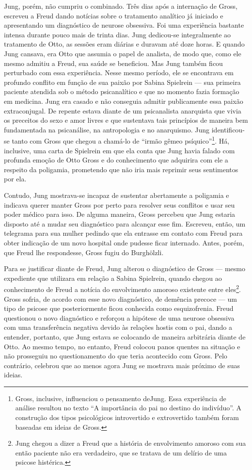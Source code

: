 Jung, porém, não cumpriu o combinado. Três dias após a internação de
Gross, escreveu a Freud dando notícias sobre o tratamento analítico já
iniciado e apresentando um diagnóstico de neurose obsessiva. Foi uma
experiência bastante intensa durante pouco mais de trinta dias. Jung
dedicou-se integralmente ao tratamento de Otto, as sessões eram diárias
e duravam até doze horas. E quando Jung cansava, era Otto que assumia o
papel de analista, de modo que, como ele mesmo admitiu a Freud, sua
saúde se beneficiou. Mas Jung também ficou perturbado com essa
experiência. Nesse mesmo período, ele se encontrava em profundo conflito
em função de sua paixão por Sabina Spielrein --- sua primeira paciente
atendida sob o método psicanalítico e que no momento fazia formação em
medicina. Jung era casado e não conseguia admitir publicamente essa
paixão extraconjugal. De repente estava diante de um psicanalista
anarquista que vivia os preceitos do sexo e amor livres e que sustentava
tais princípios de maneira bem fundamentada na psicanálise, na
antropologia e no anarquismo. Jung identificou-se tanto com Gross que
chegou a chamá-lo de ``irmão gêmeo psíquico''\footnote{Gross, inclusive,
  influenciou o pensamento deJung. Essa experiência de análise resultou
  no texto ``A importância do pai no destino do indivíduo''. A
  construção dos tipos psicológicos introvertido e extrovertido também
  foram baseadas em ideias de Gross.}. Há, inclusive, uma carta de
Spielrein em que ela conta que Jung havia falado com profunda emoção de
Otto Gross e do conhecimento que adquirira com ele a respeito da
poligamia, prometendo que não iria mais reprimir seus sentimentos por
ela.

Contudo, Jung mostrava-se incapaz de sustentar abertamente a poligamia e
indicava querer manter Gross por perto para resolver seus conflitos e
usar seu poder médico para isso. De alguma maneira, Gross percebeu que
Jung estaria disposto até a mudar seu diagnóstico para alcançar esse
fim. Escreveu, então, um telegrama para sua mulher pedindo que ela
entrasse em contato com Freud para obter indicação de um novo hospital
onde pudesse ficar internado. Antes, porém, que Freud lhe respondesse,
Gross fugiu do Burghölzli.

Para se justificar diante de Freud, Jung alterou o diagnóstico de Gross
--- mesmo expediente que utilizara em relação a Sabina Spielrein, quando
chegou ao conhecimento de Freud a notícia do envolvimento amoroso
existente entre eles\footnote{Jung chegou a dizer a Freud que a história
  de envolvimento amoroso com sua então paciente não era verdadeiro, que
  se tratava de um delírio de uma psicose histérica.}. Gross sofria, de
acordo com esse novo diagnóstico, de demência precoce --- um tipo de
psicose que posteriormente ficou conhecida como esquizofrenia. Freud
questionou o novo diagnóstico e reforçou a hipótese de uma neurose
obsessiva com uma transferência negativa devido às relações hostis com o
pai, dando a entender, portanto, que Jung estava se colocando de maneira
arbitrária diante de Otto. Ao mesmo tempo, no entanto, Freud colocou
panos quentes na situação e não prosseguiu no questionamento do que
teria acontecido com Gross. Pelo contrário, celebrou que ao menos agora
Jung se mostrava mais próximo de suas ideias.

